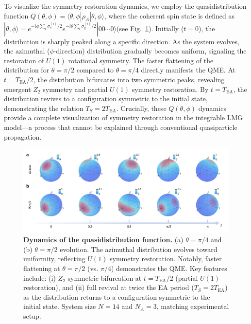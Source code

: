 \documentclass[reprint,superscriptaddress,preprintnumbers,longbibliography,
amsmath,amssymb,aps,floatfix,pra,twocolumn, tightenlines %
]{revtex4-2}
\begin{document}
    To visualize the symmetry restoration dynamics, we employ the quasidistribution function $Q(\theta,\phi) = \langle \theta,\phi | \rho_A | \theta,\phi \rangle$, where the coherent spin state is defined as $|\theta,\phi\rangle = e^{-i\phi\sum_i \sigma_z^{(i)}/2} e^{-i\theta\sum_i \sigma_y^{(i)}/2} |00\cdots0\rangle$(see Fig.~\ref{Figure_Qfunction}). Initially ($t=0$), the distribution is sharply peaked along a specific direction. As the system evolves, the azimuthal ($\phi$-direction) distribution gradually becomes uniform, signaling the restoration of $U(1)$ rotational symmetry. The faster flattening of the distribution for $\theta=\pi/2$ compared to $\theta=\pi/4$ directly manifests the QME. At $t=T_{\text{EA}}/2$, the distribution bifurcates into two symmetric peaks, revealing emergent $Z_2$ symmetry and partial $U(1)$ symmetry restoration. By $t=T_{\text{EA}}$, the distribution revives to a configuration symmetric to the initial state, demonstrating the relation $T_S = 2T_{\text{EA}}$.
    Crucially, these $Q(\theta,\phi)$ dynamics provide a complete visualization of symmetry restoration in the integrable LMG model—a process that cannot be explained through conventional quasiparticle propagation.
    
\begin{figure}[t]
    \centering
    \includegraphics[width=1.0\textwidth]{suppFig/Figure_Qfunction.pdf}
    \caption{
        \textbf{Dynamics of the quasidistribution function.} 
        (a) $\theta = \pi/4$ and (b) $\theta = \pi/2$ evolution. The azimuthal distribution evolves toward uniformity, reflecting $U(1)$ symmetry restoration. Notably, faster flattening at $\theta = \pi/2$ (vs. $\pi/4$) demonstrates the QME. Key features include: (i) $Z_2$-symmetric bifurcation at $t = T_{\text{EA}}/2$ (partial $U(1)$ restoration), and (ii) full revival at twice the EA period ($T_S = 2T_{\text{EA}}$) as the distribution returns to a configuration symmetric to the initial state. System size $N=14$ and $N_A=3$, matching experimental setup.}
    \label{Figure_Qfunction}
\end{figure}
\end{document}
